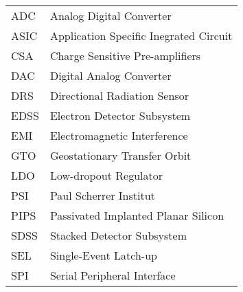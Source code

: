 \begin{center}
\begin{tabular}{p{2cm}p{8cm}}
	ADC & Analog Digital Converter \\
	ASIC & Application Specific Inegrated Circuit \\
	CSA & Charge Sensitive Pre-amplifiers \\
	DAC & Digital Analog Converter \\
	DRS & Directional Radiation Sensor \\
	EDSS & Electron Detector Subsystem \\
	EMI & Electromagnetic Interference \\
	GTO & Geostationary Transfer Orbit \\
	LDO & Low-dropout Regulator \\
	PSI & Paul Scherrer Institut \\
	PIPS & Passivated Implanted Planar Silicon \\
	SDSS & Stacked Detector Subsystem \\
	SEL & Single-Event Latch-up \\
	SPI & Serial Peripheral Interface \\
\end{tabular}
\end{center}
